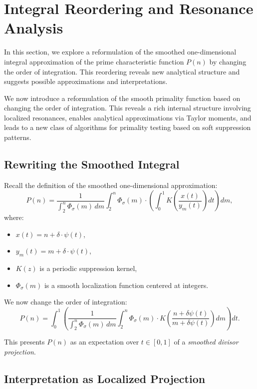 \documentclass[12pt]{article}
\theoremstyle{definition}
\theoremstyle{plain}
\theoremstyle{remark}
\begin{document}
\section{Integral Reordering and Resonance Analysis}

In this section, we explore a reformulation of the smoothed one-dimensional integral approximation of the prime characteristic function \( P(n) \) by changing the order of integration. This reordering reveals new analytical structure and suggests possible approximations and interpretations.

We now introduce a reformulation of the smooth primality function based on changing the order of integration. This reveals a rich internal structure involving localized resonances, enables analytical approximations via Taylor moments, and leads to a new class of algorithms for primality testing based on soft suppression patterns.

\subsection{Rewriting the Smoothed Integral}

Recall the definition of the smoothed one-dimensional approximation:
\[
P(n) = \frac{1}{\int_2^n \Phi_\sigma(m)\, dm} \int_2^n \Phi_\sigma(m) \cdot \left( \int_0^1 K\left( \frac{x(t)}{y_m(t)} \right) dt \right) dm,
\]
where:
\begin{itemize}
  \item \( x(t) = n + \delta \cdot \psi(t) \),
  \item \( y_m(t) = m + \delta \cdot \psi(t) \),
  \item \( K(z) \) is a periodic suppression kernel,
  \item \( \Phi_\sigma(m) \) is a smooth localization function centered at integers.
\end{itemize}

We now change the order of integration:
\[
P(n) = \int_0^1 \left( \frac{1}{\int_2^n \Phi_\sigma(m)\, dm} \int_2^n \Phi_\sigma(m) \cdot K\left( \frac{n + \delta \psi(t)}{m + \delta \psi(t)} \right) dm \right) dt.
\]

This presents \( P(n) \) as an expectation over \( t \in [0,1] \) of a \emph{smoothed divisor projection}.

\subsection{Interpretation as Localized Projection}
\end{document}
